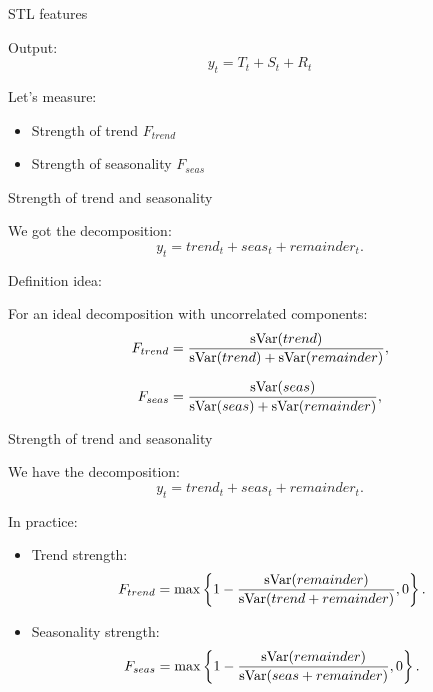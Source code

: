 \begin{frame}{STL features}
	
	\alert{Output:}
	\[
	y_t = T_t + S_t + R_t
	\]
	
	\pause
	Let's measure:
	\begin{itemize}
		\item Strength of  trend $F_{trend}$
		\item Strength of  seasonality $F_{seas}$
	\end{itemize}
	
\end{frame}

\begin{frame}{Strength of trend and seasonality}
	
	We got the decomposition:
	\[
	y_t = trend_t + seas_t + remainder_t.
	\]
	
	\pause
	\alert{Definition idea:}
	
	For an ideal decomposition with uncorrelated components:
	\[
	F_{trend} = \frac{\operatorname{sVar}(trend)}{\operatorname{sVar}(trend) + \operatorname{sVar}(remainder)},
	\]
	
	\pause
	\[
	F_{seas} = \frac{\operatorname{sVar}(seas)}{\operatorname{sVar}(seas) + \operatorname{sVar}(remainder)},
	\]
\end{frame}

\begin{frame}{Strength of trend and seasonality}
	
	We have the decomposition:
	\[
	y_t = trend_t + seas_t + remainder_t.
	\]
	
	\pause
	\alert{In practice}:
	\begin{itemize}[<+->]
		\item Trend strength:
		\[
		F_{trend} = \max\left\{1 - \frac{\operatorname{sVar}(remainder)}{\operatorname{sVar}(trend + remainder)}, 0 \right\}.
		\]
		\item Seasonality strength:
		\[
		F_{seas} = \max\left\{1 - \frac{\operatorname{sVar}(remainder)}{\operatorname{sVar}(seas + remainder)}, 0 \right\}.
		\]
		
	\end{itemize}
	
	
	
\end{frame}


